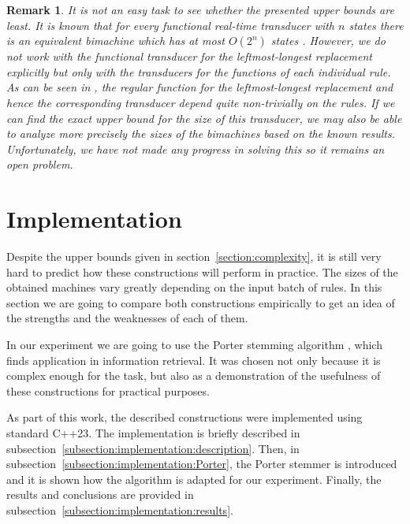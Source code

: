 \documentclass{article}
\newtheorem{remark}[definition]{Remark}
\begin{document}
	\begin{remark}
		It is not an easy task to see whether the presented upper bounds are least. It is known that for every functional real-time transducer with $n$ states there is an equivalent bimachine which has at most $O(2^n)$ states \cite{Gerdjikov-Mihov-Schulz-2019:bimachine-equalizer}. However, we do not work with the functional transducer for the leftmost-longest replacement explicitly but only with the transducers for the functions of each individual rule. As can be seen in \cite{Kaplan-Kay-1994}, the regular function for the leftmost-longest replacement and hence the corresponding transducer depend quite non-trivially on the rules. If we can find the exact upper bound for the size of this transducer, we may also be able to analyze more precisely the sizes of the bimachines based on the known results.
		Unfortunately, we have not made any progress in solving this so it remains an open problem.
	\end{remark}

	\section{Implementation} \label{section:implementation}
	Despite the upper bounds given in section~\ref{section:complexity}, it is still very hard to predict how these constructions will perform in practice. The sizes of the obtained machines vary greatly depending on the input batch of rules.
	In this section we are going to compare both constructions empirically to get an idea of the strengths and the weaknesses of each of them.
	
	In our experiment we are going to use the Porter stemming algorithm \cite{Porter-stemmer}, which finds application in information retrieval. It was chosen not only because it is complex enough for the task, but also as a demonstration of the usefulness of these constructions for practical purposes.
	
	As part of this work, the described constructions were implemented using standard C++23. 
	The implementation is briefly described in subsection~\ref{subsection:implementation:description}.
	Then, in subsection~\ref{subsection:implementation:Porter}, the Porter stemmer is introduced and it is shown how the algorithm is adapted for our experiment.
	Finally, the results and conclusions are provided in subsection~\ref{subsection:implementation:results}.
	
\end{document}
